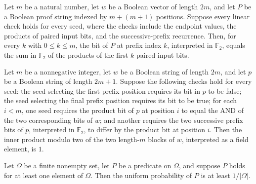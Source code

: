 \begin{theorem}
\label{FABL.innerProductPrefixProof_eq_of_checks}
\leanok
{}
Let $m$ be a natural number, let $w$ be a Boolean vector of length $2m$, and let $P$ be
a Boolean proof string indexed by $m+(m+1)$ positions. Suppose every linear check holds
for every seed, where the checks include the endpoint values, the products of paired
input bits, and the successive-prefix recurrence. Then, for every $k$ with $0\le k\le
m$, the bit of $P$ at prefix index $k$, interpreted in $\mathbb{F}_2$, equals the sum in
$\mathbb{F}_2$ of the products of the first $k$ paired input bits.
\end{theorem}

\begin{theorem}
\label{FABL.isInnerProductModTwoOne_of_linearChecks}
\leanok
{}
Let $m$ be a nonnegative integer, let $w$ be a Boolean string of length $2m$, and let
$p$ be a Boolean string of length $2m+1$. Suppose the following checks hold for every
seed: the seed selecting the first prefix position requires its bit in $p$ to be false;
the seed selecting the final prefix position requires its bit to be true; for each
$i<m$, one seed requires the product bit of $p$ at position $i$ to equal the AND of the
two corresponding bits of $w$; and another requires the two successive prefix bits of
$p$, interpreted in $\mathbb F_2$, to differ by the product bit at position $i$. Then
the inner product modulo two of the two length-$m$ blocks of $w$, interpreted as a field
element, is $1$.
\end{theorem}

\begin{theorem}
\label{FABL.one_div_card_le_uniformProbability_of_mem}
\leanok
{}
Let $\Omega$ be a finite nonempty set, let $P$ be a predicate on $\Omega$, and suppose
$P$ holds for at least one element of $\Omega$. Then the uniform probability of $P$ is
at least $1/|\Omega|$.
\end{theorem}

